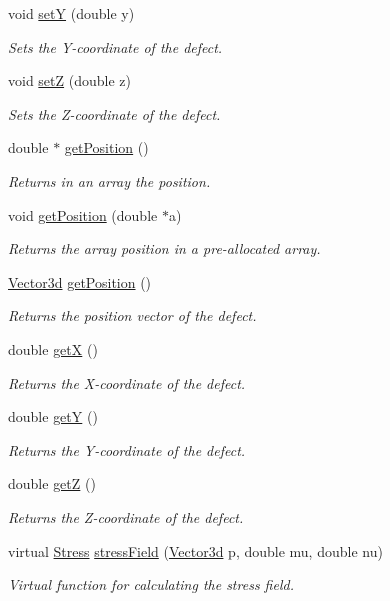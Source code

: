 \begin{DoxyCompactItemize}
void \hyperlink{classDefect_a268606391a4eaee3de029d2005648b6f}{set\-Y} (double y)
\begin{DoxyCompactList}\small\item\em Sets the Y-\/coordinate of the defect. \end{DoxyCompactList}\item 
void \hyperlink{classDefect_abb0b16c44a1b04d782f5c5f598b49d5b}{set\-Z} (double z)
\begin{DoxyCompactList}\small\item\em Sets the Z-\/coordinate of the defect. \end{DoxyCompactList}\item 
double $\ast$ \hyperlink{classDefect_a270caed3561fa5fa284af6427b6ca2e4}{get\-Position} ()
\begin{DoxyCompactList}\small\item\em Returns in an array the position. \end{DoxyCompactList}\item 
void \hyperlink{classDefect_aace5c752b85c368631746abc3d5bd714}{get\-Position} (double $\ast$a)
\begin{DoxyCompactList}\small\item\em Returns the array position in a pre-\/allocated array. \end{DoxyCompactList}\item 
\hyperlink{classVector3d}{Vector3d} \hyperlink{classDefect_a270caed3561fa5fa284af6427b6ca2e4}{get\-Position} ()
\begin{DoxyCompactList}\small\item\em Returns the position vector of the defect. \end{DoxyCompactList}\item 
double \hyperlink{classDefect_a01b96c453c13db82b5835682e1849dc0}{get\-X} ()
\begin{DoxyCompactList}\small\item\em Returns the X-\/coordinate of the defect. \end{DoxyCompactList}\item 
double \hyperlink{classDefect_a9ea8df3b4c621762a327813056e63911}{get\-Y} ()
\begin{DoxyCompactList}\small\item\em Returns the Y-\/coordinate of the defect. \end{DoxyCompactList}\item 
double \hyperlink{classDefect_a6f59edeca7ca8bfa01c54fd6b1a62374}{get\-Z} ()
\begin{DoxyCompactList}\small\item\em Returns the Z-\/coordinate of the defect. \end{DoxyCompactList}\item 
virtual \hyperlink{classStress}{Stress} \hyperlink{classDefect_a5730a89ce804d75090c9fa35ffdfefa2}{stress\-Field} (\hyperlink{classVector3d}{Vector3d} p, double mu, double nu)
\begin{DoxyCompactList}\small\item\em Virtual function for calculating the stress field. \end{DoxyCompactList}\end{DoxyCompactItemize}
